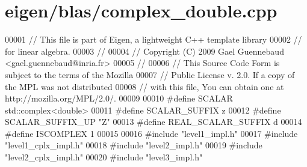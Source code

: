 \hypertarget{eigen_2blas_2complex__double_8cpp_source}{}\section{eigen/blas/complex\+\_\+double.cpp}
\label{eigen_2blas_2complex__double_8cpp_source}

\begin{DoxyCode}
00001 \textcolor{comment}{// This file is part of Eigen, a lightweight C++ template library}
00002 \textcolor{comment}{// for linear algebra.}
00003 \textcolor{comment}{//}
00004 \textcolor{comment}{// Copyright (C) 2009 Gael Guennebaud <gael.guennebaud@inria.fr>}
00005 \textcolor{comment}{//}
00006 \textcolor{comment}{// This Source Code Form is subject to the terms of the Mozilla}
00007 \textcolor{comment}{// Public License v. 2.0. If a copy of the MPL was not distributed}
00008 \textcolor{comment}{// with this file, You can obtain one at http://mozilla.org/MPL/2.0/.}
00009 
00010 \textcolor{preprocessor}{#define SCALAR        std::complex<double>}
00011 \textcolor{preprocessor}{#define SCALAR\_SUFFIX z}
00012 \textcolor{preprocessor}{#define SCALAR\_SUFFIX\_UP "Z"}
00013 \textcolor{preprocessor}{#define REAL\_SCALAR\_SUFFIX d}
00014 \textcolor{preprocessor}{#define ISCOMPLEX     1}
00015 
00016 \textcolor{preprocessor}{#include "level1\_impl.h"}
00017 \textcolor{preprocessor}{#include "level1\_cplx\_impl.h"}
00018 \textcolor{preprocessor}{#include "level2\_impl.h"}
00019 \textcolor{preprocessor}{#include "level2\_cplx\_impl.h"}
00020 \textcolor{preprocessor}{#include "level3\_impl.h"}
\end{DoxyCode}
